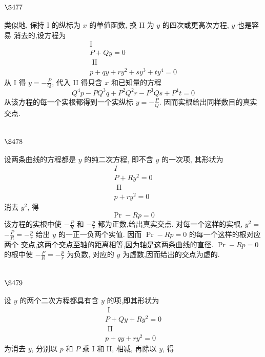 \section{$\S 477$}

类似地, 保持 I 的纵标为 $x$ 的单值函数, 换 II 为 $y$ 的四次或更高次方程, $y$ 也是容易 消去的,设方程为
\[
\begin{gathered}
\mathrm{I} \\
P+Q y=0 \\
\text { II } \\
p+q y+r y^{2}+s y^{3}+t y^{4}=0
\end{gathered}
\]
从 I 得 $y=-\frac{P}{Q}$, 代入 II 得只含 $x$ 和已知量的方程
\[
Q^{4} p-P Q^{3} q+P^{2} Q^{2} r-P^{3} Q s+P^{4} t=0
\]
从该方程的每一个实根都得到一个实纵标 $y=-\frac{P}{Q}$. 因而实根给出同样数目的真实 交点.

\section{$\S 478$}

设两条曲线的方程都是 $y$ 的纯二次方程, 即不含 $y$ 的一次项, 其形状为 
\[
\begin{gathered}
I \\
P+R y^{2}=0 \\
\text { II } \\
p+r y^{2}=0
\end{gathered}
\]
消去 $y^{2}$, 得
\[
\operatorname{Pr}-R p=0
\]
该方程的实根中使 $-\frac{P}{R}$ 和 $-\frac{p}{r}$ 都为正数,给出真实交点. 对每一个这样的实根, $y^{2}=$ $-\frac{P}{R}=-\frac{p}{r}$ 给出 $y$ 的一正一负两个实值. 因而 $\operatorname{Pr}-R p=0$ 的每一个这样的根对应两个 交点,这两个交点至轴的距离相等,因为轴是这两条曲线的直径. $\operatorname{Pr}-R p=0$ 的根中使 $-\frac{P}{R}=-\frac{p}{r}$ 为负数, 对应的 $y$ 为虚数,因而给出的交点为虚的.

\section{$\S 479$}

设 $y$ 的两个二次方程都具有含 $y$ 的项,即其形状为
\[
\begin{gathered}
\text { I } \\
P+Q y+R y^{2}=0 \\
\text { II } \\
p+q y+r y^{2}=0
\end{gathered}
\]
为消去 $y$, 分别以 $p$ 和 $P$ 乘 I 和 II, 相减, 再除以 $y$, 得

